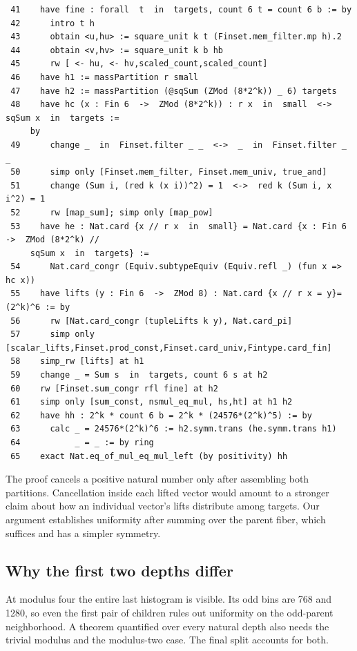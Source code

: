 \documentclass[12pt,letterpaper]{article}
\begin{document}
\par
{\fontsize{8.8}{10.5}\selectfont\begin{verbatim}
 41    have fine : forall  t  in  targets, count 6 t = count 6 b := by
 42      intro t h
 43      obtain <u,hu> := square_unit k t (Finset.mem_filter.mp h).2
 44      obtain <v,hv> := square_unit k b hb
 45      rw [ <- hu, <- hv,scaled_count,scaled_count]
 46    have h1 := massPartition r small
 47    have h2 := massPartition (@sqSum (ZMod (8*2^k)) _ 6) targets
 48    have hc (x : Fin 6  ->  ZMod (8*2^k)) : r x  in  small  <->  sqSum x  in  targets :=
     by
 49      change _  in  Finset.filter _ _  <->  _  in  Finset.filter _ _
 50      simp only [Finset.mem_filter, Finset.mem_univ, true_and]
 51      change (Sum i, (red k (x i))^2) = 1  <->  red k (Sum i, x i^2) = 1
 52      rw [map_sum]; simp only [map_pow]
 53    have he : Nat.card {x // r x  in  small} = Nat.card {x : Fin 6  ->  ZMod (8*2^k) //
     sqSum x  in  targets} :=
 54      Nat.card_congr (Equiv.subtypeEquiv (Equiv.refl _) (fun x => hc x))
 55    have lifts (y : Fin 6  ->  ZMod 8) : Nat.card {x // r x = y}=(2^k)^6 := by
 56      rw [Nat.card_congr (tupleLifts k y), Nat.card_pi]
 57      simp only [scalar_lifts,Finset.prod_const,Finset.card_univ,Fintype.card_fin]
 58    simp_rw [lifts] at h1
 59    change _ = Sum s  in  targets, count 6 s at h2
 60    rw [Finset.sum_congr rfl fine] at h2
 61    simp only [sum_const, nsmul_eq_mul, hs,ht] at h1 h2
 62    have hh : 2^k * count 6 b = 2^k * (24576*(2^k)^5) := by
 63      calc _ = 24576*(2^k)^6 := h2.symm.trans (he.symm.trans h1)
 64           _ = _ := by ring
 65    exact Nat.eq_of_mul_eq_mul_left (by positivity) hh
\end{verbatim}}
The proof cancels a positive natural number only after assembling both partitions. Cancellation inside each lifted vector would amount to a stronger claim about how an individual vector's lifts distribute among targets. Our argument establishes uniformity after summing over the parent fiber, which suffices and has a simpler symmetry.
\clearpage{}\subsection*{Why the first two depths differ}
At modulus four the entire last histogram is visible. Its odd bins are 768 and 1280, so even the first pair of children rules out uniformity on the odd-parent neighborhood. A theorem quantified over every natural depth also needs the trivial modulus and the modulus-two case. The final split accounts for both.
\end{document}
